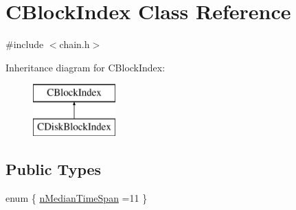 \hypertarget{class_c_block_index}{}\section{C\+Block\+Index Class Reference}
\label{class_c_block_index}


{\ttfamily \#include $<$chain.\+h$>$}

Inheritance diagram for C\+Block\+Index\+:\begin{figure}[H]
\begin{center}
\leavevmode
\includegraphics[height=2.000000cm]{class_c_block_index}
\end{center}
\end{figure}
\subsection*{Public Types}
\begin{DoxyCompactItemize}
\item 
enum \{ \hyperlink{class_c_block_index_acefc16035e60d7bd52ed2c9bb1aa838eaa2b8ad73c4fe37a8de8748d949c334d4}{n\+Median\+Time\+Span} =11
 \}
\end{DoxyCompactItemize}
